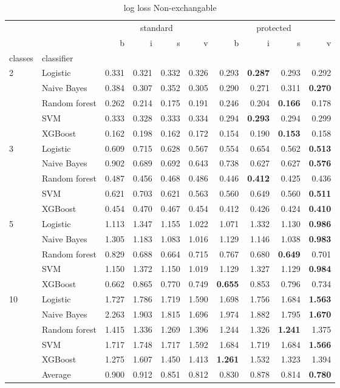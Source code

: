 \begin{table}
\caption{log loss Non-exchangable}
\begin{tabular}{l|l|rrrr|rrrr}
\toprule
 &  & \multicolumn{4}{c}{standard} & \multicolumn{4}{c}{protected} \\
 &  & b & i & s & v & b & i & s & v \\
classes & classifier &  &  &  &  &  &  &  &  \\
\midrule
\midrule
\multirow[c]{5}{*}{2} & Logistic & 0.331 & 0.321 & 0.332 & 0.326 & 0.293 & \textbf{0.287} & 0.293 & 0.292 \\
 & Naive Bayes & 0.384 & 0.307 & 0.352 & 0.305 & 0.290 & 0.271 & 0.311 & \textbf{0.270} \\
 & Random forest & 0.262 & 0.214 & 0.175 & 0.191 & 0.246 & 0.204 & \textbf{0.166} & 0.178 \\
 & SVM & 0.333 & 0.328 & 0.333 & 0.334 & 0.294 & \textbf{0.293} & 0.294 & 0.299 \\
 & XGBoost & 0.162 & 0.198 & 0.162 & 0.172 & 0.154 & 0.190 & \textbf{0.153} & 0.158 \\
\midrule
\multirow[c]{5}{*}{3} & Logistic & 0.609 & 0.715 & 0.628 & 0.567 & 0.554 & 0.654 & 0.562 & \textbf{0.513} \\
 & Naive Bayes & 0.902 & 0.689 & 0.692 & 0.643 & 0.738 & 0.627 & 0.627 & \textbf{0.576} \\
 & Random forest & 0.487 & 0.456 & 0.468 & 0.486 & 0.446 & \textbf{0.412} & 0.425 & 0.436 \\
 & SVM & 0.621 & 0.703 & 0.621 & 0.563 & 0.560 & 0.649 & 0.560 & \textbf{0.511} \\
 & XGBoost & 0.454 & 0.470 & 0.467 & 0.454 & 0.412 & 0.426 & 0.424 & \textbf{0.410} \\
\midrule
\multirow[c]{5}{*}{5} & Logistic & 1.113 & 1.347 & 1.155 & 1.022 & 1.071 & 1.332 & 1.130 & \textbf{0.986} \\
 & Naive Bayes & 1.305 & 1.183 & 1.083 & 1.016 & 1.129 & 1.146 & 1.038 & \textbf{0.983} \\
 & Random forest & 0.829 & 0.688 & 0.664 & 0.715 & 0.767 & 0.680 & \textbf{0.649} & 0.701 \\
 & SVM & 1.150 & 1.372 & 1.150 & 1.019 & 1.129 & 1.327 & 1.129 & \textbf{0.984} \\
 & XGBoost & 0.662 & 0.865 & 0.770 & 0.749 & \textbf{0.655} & 0.853 & 0.796 & 0.734 \\
\midrule
\multirow[c]{5}{*}{10} & Logistic & 1.727 & 1.786 & 1.719 & 1.590 & 1.698 & 1.756 & 1.684 & \textbf{1.563} \\
 & Naive Bayes & 2.263 & 1.903 & 1.815 & 1.696 & 1.974 & 1.882 & 1.795 & \textbf{1.670} \\
 & Random forest & 1.415 & 1.336 & 1.269 & 1.396 & 1.244 & 1.326 & \textbf{1.241} & 1.375 \\
 & SVM & 1.717 & 1.748 & 1.717 & 1.592 & 1.684 & 1.719 & 1.684 & \textbf{1.566} \\
 & XGBoost & 1.275 & 1.607 & 1.450 & 1.413 & \textbf{1.261} & 1.532 & 1.323 & 1.394 \\\midrule\ & Average & 0.900 & 0.912 & 0.851 & 0.812 & 0.830 & 0.878 & 0.814 & \textbf{0.780} \\
\bottomrule
\end{tabular}
\end{table}
